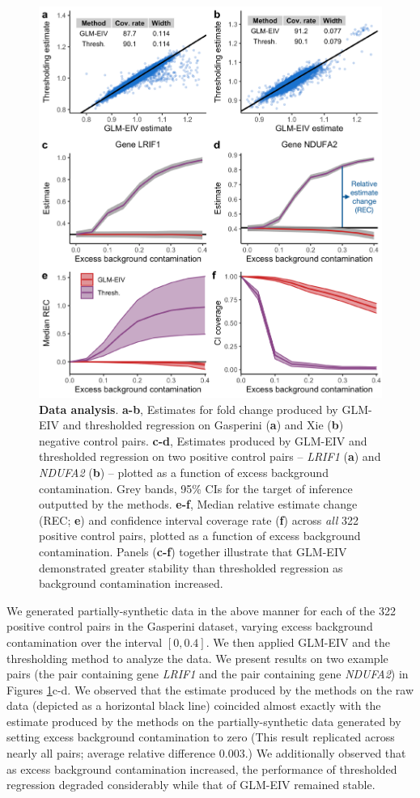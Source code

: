 \documentclass[12pt]{article}
\begin{document}
\begin{figure}[h!]
	\centering
	\includegraphics[width=0.9\linewidth]{figures/data_analysis.pdf}
	\caption{\textbf{Data analysis}. \textbf{a-b}, Estimates for fold change produced by GLM-EIV and thresholded regression on Gasperini (\textbf{a}) and Xie (\textbf{b}) negative control pairs. \textbf{c-d}, Estimates produced by GLM-EIV and thresholded regression on two positive control pairs -- \textit{LRIF1} (\textbf{a}) and \textit{NDUFA2} (\textbf{b}) -- plotted as a function of excess background contamination. Grey bands, 95\% CIs for the target of inference outputted by the methods. \textbf{e-f}, Median relative estimate change (REC; \textbf{e}) and confidence interval coverage rate (\textbf{f}) across \textit{all} 322 positive control pairs, plotted as a function of excess background contamination. Panels (\textbf{c-f}) together illustrate that GLM-EIV demonstrated greater stability than thresholded regression as background contamination increased.}\label{fig:real_data}
\end{figure}

We generated partially-synthetic data in the above manner for each of the 322 positive control pairs in the Gasperini dataset, varying excess background contamination over the interval $[0,0.4].$ We then applied GLM-EIV and the thresholding method to analyze the data. We present results on two example pairs (the pair containing gene \textit{LRIF1} and the pair containing gene \textit{NDUFA2}) in Figures \ref{fig:real_data}c-d. We observed that the estimate produced by the methods on the raw data (depicted as a horizontal black line) coincided almost exactly with the estimate produced by the methods on the partially-synthetic data generated by setting excess background contamination to zero (This result replicated across nearly all pairs; average relative difference $0.003$.) We additionally observed that as excess background contamination increased, the performance of thresholded regression degraded considerably while that of GLM-EIV remained stable.
\end{document}
